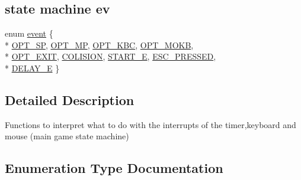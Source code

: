 \subsection*{state machine ev}
\begin{DoxyCompactItemize}
\item 
enum \hyperlink{group__man__events_ga3b65133bb9997cd1ccf311af0927fc9e}{event} \{ \\*
\hyperlink{group__man__events_gga3b65133bb9997cd1ccf311af0927fc9ea45f322741bfece70663b053c4a73498e}{O\+P\+T\+\_\+\+SP}, 
\hyperlink{group__man__events_gga3b65133bb9997cd1ccf311af0927fc9ead2f33b9d791cfb13f1933bd97e9d0de9}{O\+P\+T\+\_\+\+MP}, 
\hyperlink{group__man__events_gga3b65133bb9997cd1ccf311af0927fc9ea7e30fbbcb01736379c1ed0aa2a55b307}{O\+P\+T\+\_\+\+K\+BC}, 
\hyperlink{group__man__events_gga3b65133bb9997cd1ccf311af0927fc9eacd503cf9049dd8a7d52b314666169ad3}{O\+P\+T\+\_\+\+M\+O\+KB}, 
\\*
\hyperlink{group__man__events_gga3b65133bb9997cd1ccf311af0927fc9ea08a9c23bb05696396b02eaeedd3d8cc3}{O\+P\+T\+\_\+\+E\+X\+IT}, 
\hyperlink{group__man__events_gga3b65133bb9997cd1ccf311af0927fc9ea9b299ae0726c225c42a89eb226198133}{C\+O\+L\+I\+S\+I\+ON}, 
\hyperlink{group__man__events_gga3b65133bb9997cd1ccf311af0927fc9ea7a58ef251d725c37e2b2525fc6d91ca6}{S\+T\+A\+R\+T\+\_\+E}, 
\hyperlink{group__man__events_gga3b65133bb9997cd1ccf311af0927fc9ea375530d8bde058d39a892a3be6f017e9}{E\+S\+C\+\_\+\+P\+R\+E\+S\+S\+ED}, 
\\*
\hyperlink{group__man__events_gga3b65133bb9997cd1ccf311af0927fc9eaf5b3b945ab64a9a9915b818d526df00e}{D\+E\+L\+A\+Y\+\_\+E}
 \}
\end{DoxyCompactItemize}


\subsection{Detailed Description}
Functions to interpret what to do with the interrupts of the timer,keyboard and mouse (main game state machine) 

\subsection{Enumeration Type Documentation}
